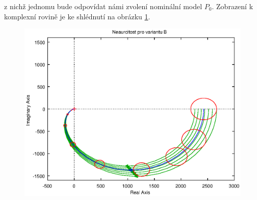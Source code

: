 \documentclass[a4paper,11pt]{article}
\begin{document}
z nichž jednomu bude odpovídat námi zvolení nominální model $ P_{0} $. Zobrazení k komplexní rovině je ke shlédnutí na obrázku \ref{fig:neurcitost-A}.
\begin{figure}[htbp]
	\begin{center}
	\includegraphics[scale = 1.0]{obrazky/neurcitostA.eps}
	\label{fig:neurcitost-A}
	\end{center}
\end{figure}
\end{document}
